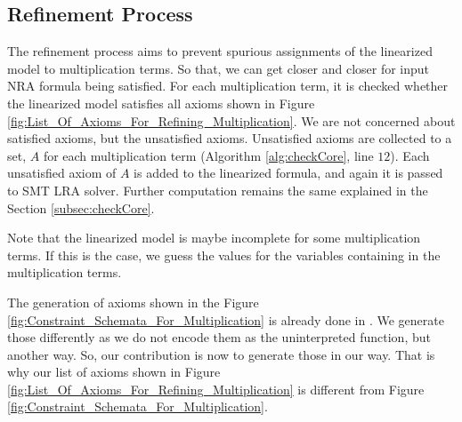 \subsection{Refinement Process}
\label{subsec:Refinement_Process}
The refinement process aims to prevent spurious assignments of the linearized model to multiplication terms.
So that, we can get closer and closer for input NRA formula being satisfied.
For each multiplication term, it is checked whether the linearized model satisfies all axioms shown in Figure \ref{fig:List_Of_Axioms_For_Refining_Multiplication}.
We are not concerned about satisfied axioms, but the unsatisfied axioms.
Unsatisfied axioms are collected to a set, $A$ for each multiplication term (Algorithm \ref{alg:checkCore}, line $12$).
Each unsatisfied axiom of $A$ is added to the linearized formula, and again it is passed to SMT LRA solver.
Further computation remains the same explained in the Section \ref{subsec:checkCore}.\newline

\noindent Note that the linearized model is maybe incomplete for some multiplication terms.
If this is the case, we guess the values for the variables containing in the multiplication terms.\newline

\noindent The generation of axioms shown in the Figure \ref{fig:Constraint_Schemata_For_Multiplication} is already done in \cite{Cimatti:2018:ILS:3274693.3230639}.
We generate those differently as we do not encode them as the uninterpreted function, but another way.
So, our contribution is now to generate those in our way.
That is why our list of axioms shown in Figure \ref{fig:List_Of_Axioms_For_Refining_Multiplication} is different from Figure \ref{fig:Constraint_Schemata_For_Multiplication}.\newpage 

